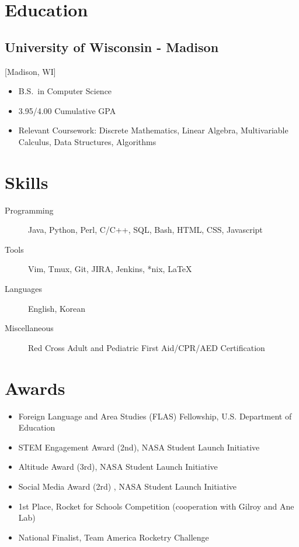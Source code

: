 \documentclass{mycv}
\begin{document}
\section{Education}

\subsection{University of Wisconsin - Madison}[Madison, WI]
\vspace{-\parskip}%
\begin{itemize}[label={}]
  \item B.S.\ in Computer Science 
  \item 3.95/4.00 Cumulative GPA
  \item Relevant Coursework: Discrete Mathematics, Linear Algebra, Multivariable Calculus, Data Structures, Algorithms  
\end{itemize}

\section{Skills}

\begin{description}
  \item[Programming] Java, Python, Perl, C/C++, SQL, Bash, HTML, CSS, Javascript
  \item[Tools] Vim, Tmux, Git, JIRA, Jenkins, *nix, \LaTeX 
  \item[Languages] English, Korean
  \item[Miscellaneous] Red Cross Adult and Pediatric First Aid/CPR/AED Certification
\end{description}

\section{Awards}
\begin{itemize}
\item{ 
Foreign Language and Area Studies (FLAS) Fellowship, U.S. Department of Education 
}
    \item {STEM Engagement Award (2nd), NASA Student Launch Initiative }
    \item {Altitude Award (3rd), NASA Student Launch Initiative }
    \item {Social Media Award (2rd) , NASA Student Launch Initiative }
    \item {1st Place, Rocket for Schools Competition (cooperation with Gilroy and Ane
Lab) }
  \item National Finalist, Team America Rocketry Challenge 
 
\end{itemize}
\thispagestyle{empty} 
\end{document}
